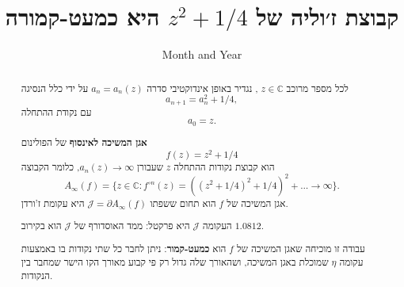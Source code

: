 \documentclass[11pt]{article}
\title{קבוצת ז׳וליה של $z^2+1/4$ היא כמעט-קמורה}
\date{Month and Year}
\begin{document}
\begin{abstract}
{\large

    לכל מספר מרוכב
    $z \in \mathbb C$
    ,
    נגדיר באופן אינדוקטיבי סדרה
$a_n=a_n(z)$
 על ידי
 כלל הנסיגה
    $$a_{n+1} = a_n ^2 + 1/4,$$
    עם נקודת ההתחלה
        $$a_0 = z.$$
    
    \textbf{אגן המשיכה לאינסוף}
    של הפולינום
    $$f(z)=z^2+1/4$$        
    הוא
    קבוצת נקודות ההתחלה 
    $z$
    שעבורן
    $a_n(z) \to \infty$,
    כלומר
הקבוצה
     $$A_\infty(f)=\{z\in \mathbb C: f^{\circ n}(z)=((z^2+1/4)^2+1/4)^2+\dots \to \infty\}.$$
אגן המשיכה של 
$f$
הוא
תחום ששפתו 
$\mathcal J=\partial A_\infty(f)$
היא עקומת ז'ורדן.

העקומה $\mathcal J$
היא פרקטל:
ממד האוסדורף של $\mathcal J$
הוא בקירוב 
$1.0812$.


עבודה זו מוכיחה שאגן המשיכה של 
$f$
 הוא 
\textbf{כמעט-קמור}:
ניתן לחבר כל שתי נקודות בו באמצעות עקומה
$\eta$
שמוכלת באגן המשיכה, 
ושהאורך שלה גדול רק פי קבוע מאורך הקו הישר שמחבר בין הנקודות.

    
    
     
    }
    
\end{abstract}
\end{document}
